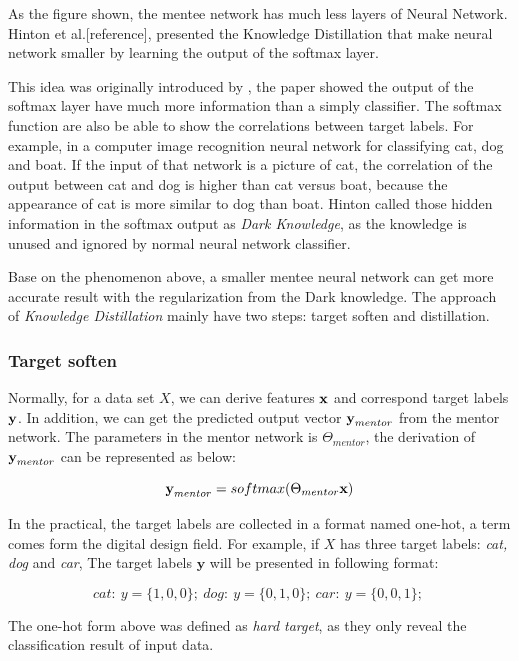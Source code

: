 \documentclass[article]{aaltoseries}
\begin{document}
As the figure shown, the mentee network has much less layers of Neural Network. 
Hinton et al.[reference], presented the Knowledge Distillation that make neural network smaller by learning the 
output of the softmax layer\cite{SoftMax}. 

This idea was originally introduced by \cite{Caruana2006}, the paper showed 
the output of the softmax layer have much more information than a simply classifier. 
The softmax function are also be able to show the correlations between
target labels. For example, in a computer image recognition neural network for classifying cat, dog and boat.
If the input of that network is a picture of cat, the correlation of the output
between cat and dog is higher than cat versus boat, because the appearance of cat is more similar to dog than boat.
Hinton called those hidden information in the softmax output as \emph{Dark Knowledge}, 
as the knowledge is unused and ignored by normal neural network classifier.

Base on the phenomenon above, a smaller mentee neural network can get more accurate result with the regularization from
the Dark knowledge. 
The approach of \emph{Knowledge Distillation} mainly have two steps: target soften and distillation.

\subsubsection{Target soften}

Normally, for a data set \(X\), we can derive features \(\textbf x \) and correspond target labels \(\textbf y\).
In addition, we can get the predicted output vector \(\textbf y_{mentor}\) from the mentor network.
The parameters in the mentor network is \(\Theta_{mentor}\), 
the derivation of \(\textbf y_{mentor}\) can be represented as below:

\[
  \textbf y_{mentor} = softmax(\Theta_{mentor} \textbf{x})
\]

In the practical, the target labels are collected in a format named one-hot, a term comes form the digital
design field\cite{DigitalDesign}. For example, if \(X\) has three target labels: \emph{cat, dog} and \emph{car},
The target labels \(\textbf{y}\) will be presented in following format:

\[
  cat:\ y = \{1,0,0\};\ 
  dog:\ y = \{0,1,0\};\ 
  car:\ y = \{0,0,1\};\ 
\]

The one-hot form above was defined as \emph{hard target}, as they only reveal the classification result of input data.
\end{document}
